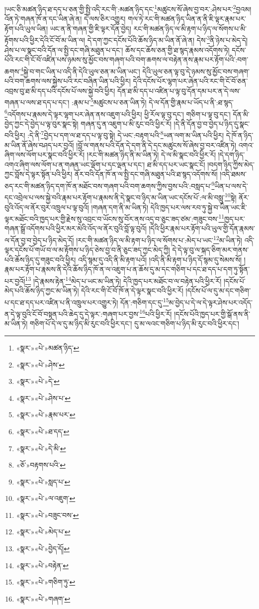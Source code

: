 །ཡང་ཅི་མཚན་ཉིད་ཐ་དད་པ་ཅན་གྱི་སྤྱི་འདི་རང་གི་:མཚན་ཉིད་དང་\footnote{«སྣར་»«པེ་»མཚན་ཉིད་}མཚུངས་སོ་ཞེས་བྱ་བར་:ཤེས་པར་\footnote{«སྣར་»«པེ་»ཤེས་}བྱའམ། འོན་ཏེ་གཞན་ཁོ་ན་དང་ཡིན་ཞེ་ན། དེ་ལས་ཅིར་འགྱུར། གལ་ཏེ་རང་གི་མཚན་ཉིད་ཡིན་ན་ནི་ཇི་ལྟར་རྣམ་པར་རྟོག་པའི་ཡུལ་ཡིན། ཡང་ན་ནི་གཞན་གྱི་ཇི་ལྟར་དོན་བྱེད། རང་གི་མཚན་ཉིད་ལ་མི་རྟག་པ་ཉིད་ལ་སོགས་པ་མི་རྟོགས་པའི་ཕྱིར་དེའི་ངོ་བོ་མ་ཡིན་ལ། དེ་དག་ཀྱང་དངོས་པོའི་ཆོས་ཉིད་མ་ཡིན་ནོ་ཞེ་ན། དེས་\footnote{«སྣར་»«པེ་»དེ་}ནི་ཉེས་པ་མེད་དེ། ཤེས་པ་ལ་སྣང་བའི་དོན་ལ་སྤྱི་དང་གཞི་མཐུན་པ་དང་། ཆོས་དང་ཆོས་ཅན་གྱི་ཐ་སྙད་རྣམས་འདོགས་ཏེ། དངོས་པོའི་རང་གི་ངོ་བོ་འཛིན་པས་ཉམས་སུ་མྱོང་བས་གཞག་པའི་བག་ཆགས་ལ་བརྟེན་ནས་རྣམ་པར་རྟོག་པའི་:བག་ཆགས་\footnote{«སྣར་»«པེ་»ཤེས་པ་}སྐྱེ་བ་གང་ཡིན་པ་འདི་ནི་དེའི་ཡུལ་ཅན་མ་ཡིན་ཡང་། དེའི་ཡུལ་ཅན་ལྟ་བུ་དེ་ཉམས་སུ་མྱོང་བས་གཞག་པའི་བག་ཆགས་ལས་སྐྱེས་པའི་རང་བཞིན་ཡིན་པའི་ཕྱིར། དེའི་དངོས་པོར་ལྷག་པར་ཞེན་པའི་རང་གི་ངོ་བོ་ཅན་འབྲས་བུ་ཐ་མི་དད་པའི་དངོས་པོ་ལས་སྐྱེ་བའི་ཕྱིར། དོན་ཐ་མི་དད་པ་འཛིན་པ་ལྟ་བུ་དོན་དམ་པར་ན་དེ་ལས་གཞན་པ་ལས་ཐ་དད་པ་དང་། :རྣམ་པ་\footnote{«སྣར་»«པེ་»རྣམ་པར་}མཚུངས་པ་ཅན་ཡིན་ཏེ། དེ་ལ་དོན་གྱི་རྣམ་པ་ཡོད་པ་ནི་:ཐ་སྙད་\footnote{«སྣར་»«པེ་»ཐ་དད་}འདོགས་པ་རྣམས་དེ་ལྟར་ལྷག་པར་ཞེན་ནས་འཇུག་པའི་ཕྱིར། ཕྱི་རོལ་ལྟ་བུ་དང་། གཅིག་པ་ལྟ་བུ་དང་། དོན་མི་བྱེད་ཀྱང་དེ་བྱེད་པ་ལྟ་བུར་སྣང་སྟེ། གཞན་དུ་ན་འཇུག་པ་མི་རུང་བའི་ཕྱིར་རོ། །དེ་ནི་དོན་བྱ་བ་བྱེད་པ་ཉིད་དུ་སྣང་བའི་ཕྱིར། :དེ་ནི་\footnote{«སྣར་»«པེ་»དེ་མི་}བྱེད་པ་དག་ལ་ཐ་དད་པ་ལྟ་བུ་སྟེ། དེ་ཡང་:བརྟག་པའི་\footnote{«ཅོ་»བརྟགས་པའི་}ཡན་ལག་མ་ཡིན་པའི་ཕྱིར། དེ་ཁོ་ན་ཉིད་མ་ཡིན་ནོ་ཞེས་བཤད་པར་བྱའོ། །བློ་ལ་གནས་པའི་དོན་དེ་དག་ནི་དེ་དང་མཚུངས་སོ་ཞེས་བྱ་བར་འཛིན་ཏེ། འགའ་ཞིག་ལས་ལོག་པར་སྣང་བའི་ཕྱིར་རོ། །རང་གི་མཚན་ཉིད་ནི་མ་ཡིན་ཏེ། དེ་ལ་མི་སྣང་བའི་ཕྱིར་རོ། །དེ་དག་ཉིད་འགའ་ཞིག་ལས་ལོག་པ་ན་གཞན་ཡང་ལྡོག་པ་དང་ལྡན་པ་དང་། ཐ་མི་དད་པར་ཡང་སྣང་ངོ། །བདག་ཉིད་ཀྱིས་མེད་ཀྱང་བློས་དེ་ལྟར་སྟོན་པའི་ཕྱིར། ནོར་བའི་དོན་ཁོ་ན་ལ་སྤྱི་དང་གཞི་མཐུན་པའི་ཐ་སྙད་འདོགས་སོ། །འདི་ཐམས་ཅད་རང་གི་མཚན་ཉིད་དག་ཁོ་ན་མཐོང་བས་གཞག་པའི་བག་ཆགས་ཀྱིས་བྱས་པའི་:བསླད་པ་\footnote{«སྣར་»«པེ་»སླད་པ་}ཡིན་པ་ལས་དེ་དང་འབྲེལ་པ་ལས་སྐྱེ་བའི་རྣམ་པར་རྟོག་པ་རྣམས་ནི་དེ་སྣང་བ་ཉིད་མ་ཡིན་ཡང་དངོས་པོ་:ལ་མི་བསླུ་\footnote{«སྣར་»«པེ་»ལ་འཇུག་}སྟེ། ནོར་བུའི་འོད་ལ་ནོར་བུར་འཁྲུལ་པ་ལྟ་བུའོ། །གཞན་དག་ནི་མ་ཡིན་ཏེ། དེའི་ཁྱད་པར་ལས་རབ་ཏུ་སྐྱེ་བ་ཡིན་ཡང་ཇི་ལྟར་མཐོང་བའི་ཁྱད་པར་གྱི་རྗེས་སུ་འབྲང་བ་ཡོངས་སུ་བོར་ནས་འདྲ་བ་ཅུང་ཟད་ཙམ་:གཟུང་བས་\footnote{«སྣར་»«པེ་»བཟུང་བས་}ཁྱད་པར་གཞན་སྒྲོ་འདོགས་པའི་ཕྱིར་མར་མེའི་འོད་ལ་ནོར་བུའི་བློ་ལྟ་བུའོ། །དེའི་ཕྱིར་རྣམ་པར་རྟོག་པའི་ཡུལ་གྱི་དོན་རྣམས་ལ་དོན་བྱ་བ་བྱེད་པ་ཉིད་མེད་དོ། །རང་གི་མཚན་ཉིད་ལ་མི་རྟག་པ་ཉིད་ལ་སོགས་པ་:མེད་པ་ཡང་\footnote{«སྣར་»«པེ་»མེད་པ་}མ་ཡིན་ཏེ། འདི་ལྟར་དངོས་པོ་གཡོ་བ་ལ་མ་རྟོགས་པ་ཉིད་ཅེས་བྱ་བ་ནི་ཅུང་ཟད་ཀྱང་མེད་ཀྱི། དེ་དེ་ལྟ་བུ་ལ་སྐད་ཅིག་མར་གནས་པའི་ཆོས་ཉིད་དུ་གཟུང་བའི་ཕྱིར། འདི་སྙམ་དུ་འདི་ནི་མི་རྟག་པའོ། །འདི་ནི་མི་རྟག་པ་ཉིད་དོ་སྙམ་དུ་སེམས་སོ། །རྣམ་པར་རྟོག་པ་རྣམས་ནི་དེའི་ཆོས་ཉིད་ཁོ་ན་ལ་འཇུག་པ་ན་ཆོས་དུ་མ་དང་གཅིག་པ་དང་ཐ་དད་པ་དག་ཏུ་སྟོན་པར་བྱའོ།\footnote{«སྣར་»«པེ་»བྱེད་དོ།} །དེ་རྣམས་རྟེན་\footnote{«སྣར་»«པེ་»བརྟེན་}མེད་པ་ཡང་མ་ཡིན་ཏེ། དེའི་ཁྱད་པར་མཐོང་བ་ལ་བརྟེན་པའི་ཕྱིར་རོ། །དངོས་པོ་མེད་པའི་ཆོས་ཉིད་ཀྱང་མ་ཡིན་ཏེ། དེའི་རང་གི་ངོ་བོ་ཁོ་ན་དེ་ལྟར་སྣང་བའི་ཕྱིར་རོ། །དངོས་པོ་ལ་དུ་མ་དང་གཅིག་པ་དང་ཐ་དད་པར་འཛིན་པ་ནི་འཁྲུལ་པར་འགྱུར་ཏེ། དོན་:གཅིག་དང་དུ་\footnote{«སྣར་»«པེ་»གཅིག་ཏུ་}མ་བྱེད་པ་དེ་ལ་དེ་ལྟར་ཤེས་པར་འདོད་ན་དེ་ལྟ་བུའི་ངོ་བོ་བསྟན་པའི་ཆེད་དུ་དེ་ལྟར་:གཞག་པར་བྱས་\footnote{«སྣར་»«པེ་»གཞག་}པའི་ཕྱིར་རོ། །དངོས་པོའི་ཁྱད་པར་གྱི་སྒོ་ནས་ནི་མ་ཡིན་ཏེ། གཅིག་པོ་དེ་ལ་དུ་མ་ཉིད་མི་རུང་བའི་ཕྱིར་དང་། དུ་མ་ལའང་གཅིག་པ་ཉིད་མི་རུང་བའི་ཕྱིར་དང་། 